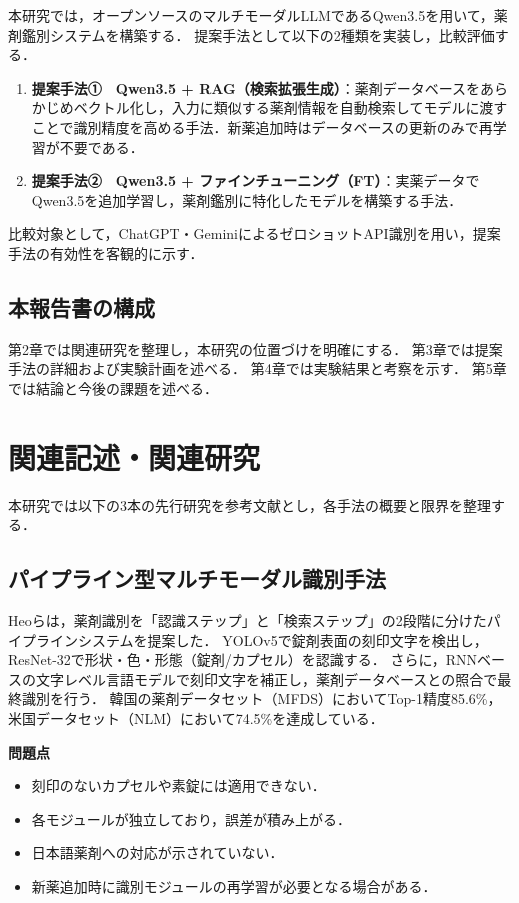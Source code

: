 \documentclass{ltjsarticle}
\begin{document}
本研究では，オープンソースのマルチモーダルLLMであるQwen3.5を用いて，薬剤鑑別システムを構築する．
提案手法として以下の2種類を実装し，比較評価する．

\begin{enumerate}
  \item \textbf{提案手法①　Qwen3.5 + RAG（検索拡張生成）}：薬剤データベースをあらかじめベクトル化し，入力に類似する薬剤情報を自動検索してモデルに渡すことで識別精度を高める手法．新薬追加時はデータベースの更新のみで再学習が不要である．
  \item \textbf{提案手法②　Qwen3.5 + ファインチューニング（FT）}：実薬データでQwen3.5を追加学習し，薬剤鑑別に特化したモデルを構築する手法．
\end{enumerate}

比較対象として，ChatGPT・GeminiによるゼロショットAPI識別を用い，提案手法の有効性を客観的に示す．

\subsection{本報告書の構成}

第2章では関連研究を整理し，本研究の位置づけを明確にする．
第3章では提案手法の詳細および実験計画を述べる．
第4章では実験結果と考察を示す．
第5章では結論と今後の課題を述べる．

\newpage

\section{関連記述・関連研究}\label{sec2}

本研究では以下の3本の先行研究を参考文献とし，各手法の概要と限界を整理する．

\subsection{パイプライン型マルチモーダル識別手法}

Heoら\cite{heo2023pill}は，薬剤識別を「認識ステップ」と「検索ステップ」の2段階に分けたパイプラインシステムを提案した．
YOLOv5で錠剤表面の刻印文字を検出し，ResNet-32で形状・色・形態（錠剤/カプセル）を認識する．
さらに，RNNベースの文字レベル言語モデルで刻印文字を補正し，薬剤データベースとの照合で最終識別を行う．
韓国の薬剤データセット（MFDS）においてTop-1精度85.6\%，米国データセット（NLM）において74.5\%を達成している．

\textbf{問題点}
\begin{itemize}
  \item 刻印のないカプセルや素錠には適用できない．
  \item 各モジュールが独立しており，誤差が積み上がる．
  \item 日本語薬剤への対応が示されていない．
  \item 新薬追加時に識別モジュールの再学習が必要となる場合がある．
\end{itemize}
\end{document}
